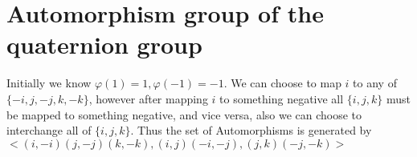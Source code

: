 \section{Automorphism group of the quaternion group}

Initially we know $\varphi(1)=1, \varphi(-1)=-1$. We can choose to map $i$ to any of $\{-i,j,-j,k,-k\}$, however after mapping $i$ to something negative all $\{i,j,k\}$ must be mapped to something negative, and vice versa, also we can choose to interchange all of $\{i,j,k\}$. Thus the set of Automorphisms is generated by $<(i,-i)(j,-j)(k,-k),(i,j)(-i,-j),(j,k)(-j,-k)>$


